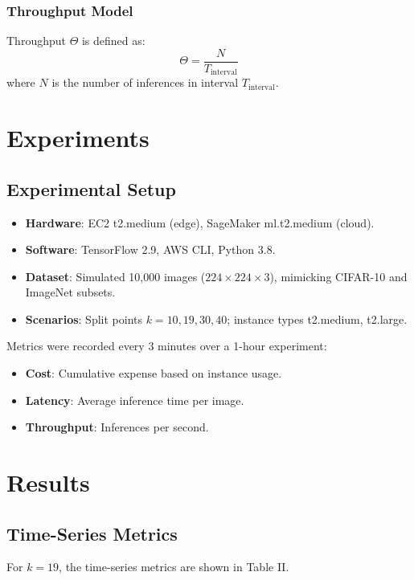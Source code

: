 \documentclass[conference]{IEEEtran}
\begin{document}
\subsubsection{Throughput Model}
Throughput \( \Theta \) is defined as:
\[
\Theta = \frac{N}{T_{\text{interval}}}
\]
where \( N \) is the number of inferences in interval \( T_{\text{interval}} \).

\section{Experiments}
\subsection{Experimental Setup}
\begin{itemize}
  \item \textbf{Hardware}: EC2 t2.medium (edge), SageMaker ml.t2.medium (cloud).
  \item \textbf{Software}: TensorFlow 2.9, AWS CLI, Python 3.8.
  \item \textbf{Dataset}: Simulated 10,000 images (\( 224 \times 224 \times 3 \)), mimicking CIFAR-10 and ImageNet subsets.
  \item \textbf{Scenarios}: Split points \( k = 10, 19, 30, 40 \); instance types t2.medium, t2.large.
\end{itemize}

Metrics were recorded every 3 minutes over a 1-hour experiment:
\begin{itemize}
  \item \textbf{Cost}: Cumulative expense based on instance usage.
  \item \textbf{Latency}: Average inference time per image.
  \item \textbf{Throughput}: Inferences per second.
\end{itemize}

\section{Results}
\subsection{Time-Series Metrics}
For \( k = 19 \), the time-series metrics are shown in Table II.
\end{document}
